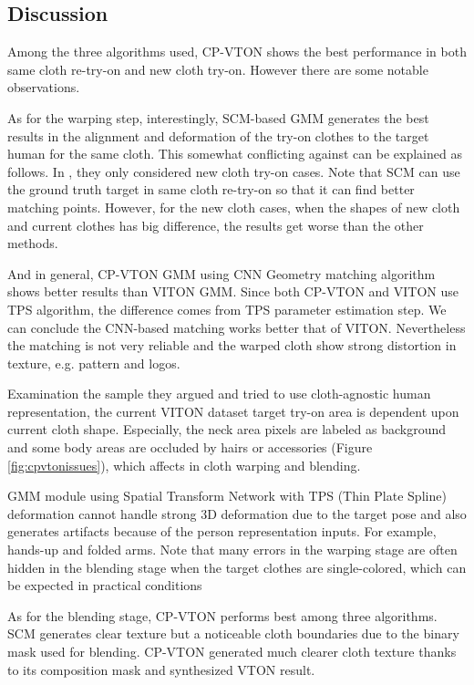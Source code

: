  
\subsection{Discussion}

Among the three algorithms used, CP-VTON shows the best performance in both same cloth re-try-on and new cloth try-on. However there are some notable observations. 

As for the warping step, interestingly, SCM-based GMM generates the best results in the alignment and deformation of the try-on clothes to the target human for the same cloth. This somewhat conflicting against \cite{Wang2018TowardCI} can be explained as follows. In \cite{Wang2018TowardCI}, they only considered new cloth try-on cases.  Note that SCM can use the ground truth target in same cloth re-try-on so that it can find better matching points. However, for the new cloth cases, when the shapes of new cloth and current clothes has big difference, the results get worse than the other methods.
  
And in general, CP-VTON GMM using CNN Geometry matching algorithm shows better results than VITON GMM. Since both CP-VTON and VITON use TPS algorithm, the difference comes from TPS parameter estimation step. We can conclude the CNN-based matching works better that of VITON. Nevertheless the matching is not very reliable and the warped cloth show strong distortion in texture, e.g. pattern and logos. 

Examination the sample they argued and tried to use cloth-agnostic human representation, the current VITON dataset target try-on area is dependent upon current cloth shape. Especially, the neck area pixels are labeled as background and some body areas are occluded by hairs or accessories (Figure \ref{fig:cpvtonissues}), which affects in cloth warping and blending. 

 
GMM module using Spatial Transform Network\cite{JaderbergSZK15} with TPS (Thin Plate Spline)\cite{Bookstein1989PrincipalWT} deformation cannot handle strong 3D deformation due to the target pose and also generates artifacts because of the person representation inputs. For example, hands-up and folded arms.  Note that many errors in the warping stage are often hidden in the blending stage when the target clothes are single-colored, which can be expected in practical conditions 

      
As for the blending stage, CP-VTON performs best among three algorithms. SCM generates clear texture but a noticeable cloth boundaries due to the binary mask used for blending.  CP-VTON generated much clearer cloth texture thanks to its composition mask and synthesized VTON result.


